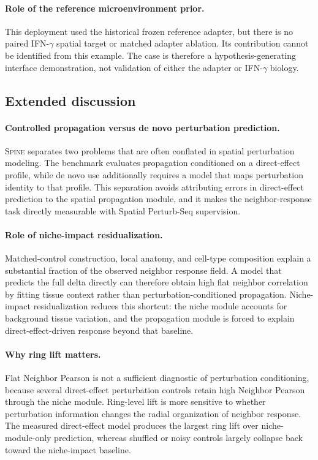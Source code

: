 \documentclass[sigconf,review,balance=false]{acmart}
\newcommand{\methodname}{\textsc{Spine}\xspace}
\begin{document}
\paragraph{Role of the reference microenvironment prior.}
This deployment used the historical frozen reference adapter, but there is no
paired IFN-$\gamma$ spatial target or matched adapter ablation. Its contribution
cannot be identified from this example. The case is therefore a
hypothesis-generating interface demonstration, not validation of either the
adapter or IFN-$\gamma$ biology.

\subsection{Extended discussion}
\label{app:extended_discussion}

\paragraph{Controlled propagation versus de novo perturbation prediction.}
\methodname{} separates two problems that are often conflated in spatial perturbation modeling. The benchmark evaluates propagation conditioned on a direct-effect profile, while de novo use additionally requires a model that maps perturbation identity to that profile. This separation avoids attributing errors in direct-effect prediction to the spatial propagation module, and it makes the neighbor-response task directly measurable with Spatial Perturb-Seq supervision.

\paragraph{Role of niche-impact residualization.}
Matched-control construction, local anatomy, and cell-type composition explain a substantial fraction of the observed neighbor response field. A model that predicts the full delta directly can therefore obtain high flat neighbor correlation by fitting tissue context rather than perturbation-conditioned propagation. Niche-impact residualization reduces this shortcut: the niche module accounts for background tissue variation, and the propagation module is forced to explain direct-effect-driven response beyond that baseline.

\paragraph{Why ring lift matters.}
Flat Neighbor Pearson is not a sufficient diagnostic of perturbation conditioning, because several direct-effect perturbation controls retain high Neighbor Pearson through the niche module. Ring-level lift is more sensitive to whether perturbation information changes the radial organization of neighbor response. The measured direct-effect model produces the largest ring lift over niche-module-only prediction, whereas shuffled or noisy controls largely collapse back toward the niche-impact baseline.
\end{document}
